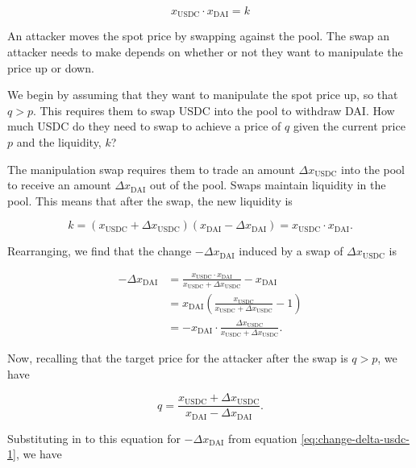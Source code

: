 \documentclass[a4paper, 11pt]{article}
\begin{document}
\begin{equation}
x_{\text{USDC}} \cdot x_{\text{DAI}} = k
\end{equation}

An attacker moves the spot price by swapping against the pool. The swap an attacker needs to make depends on whether or not they want to manipulate the price up or down. 

We begin by assuming that they want to manipulate the spot price up, so that $q > p$. This requires them to swap USDC into the pool to withdraw DAI. How much USDC do they need to swap to achieve a price of $q$ given the current price $p$ and the liquidity, $k$?

The manipulation swap requires them to trade an amount $\Delta x_{\text{USDC}}$ into the pool to receive an amount $\Delta x_{\text{DAI}}$ out of the pool. Swaps maintain liquidity in the pool. This means that after the swap, the new liquidity is

\begin{equation}
k = (x_{\text{USDC}} + \Delta x_{\text{USDC}}) (x_{\text{DAI}} - \Delta x_{\text{DAI}}) = x_{\text{USDC}} \cdot x_{\text{DAI}}.
\end{equation}

Rearranging, we find that the change $-\Delta x_{\text{DAI}}$ induced by a swap of $\Delta x_{\text{USDC}}$ is 

\begin{align}
\label{eq:change-delta-usdc-1}
-\Delta x_{\text{DAI}} 
&= 
\frac{x_{\text{USDC}} \cdot x_{\text{DAI}}}{x_{\text{USDC}} + \Delta x_{\text{USDC}}} - x_{\text{DAI}} \\ \nonumber
&=
x_{\text{DAI}} \left( \frac{x_{\text{USDC}}}{x_{\text{USDC}} + \Delta x_{\text{USDC}}} - 1 \right) \\ \nonumber
&=
-x_{\text{DAI}} \cdot \frac{\Delta x_{\text{USDC}}}{x_{\text{USDC}} + \Delta x_{\text{USDC}}}.
\end{align}

Now, recalling that the target price for the attacker after the swap is $q > p$, we have

\begin{equation}
q
=
\frac{x_{\text{USDC}} + \Delta x_{\text{USDC}}}{x_{\text{DAI}} - \Delta x_{\text{DAI}}}.
\end{equation}

Substituting in to this equation for $-\Delta x_{\text{DAI}}$ from equation \eqref{eq:change-delta-usdc-1}, we have
\end{document}
